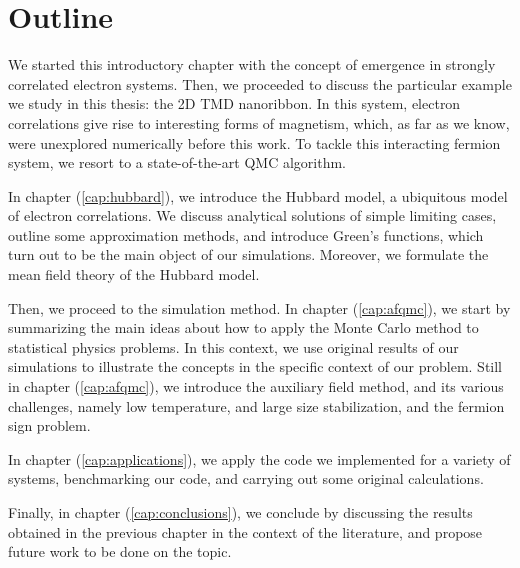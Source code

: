 \section{Outline}
\label{sec:int_outline}

We started this introductory chapter with the concept of emergence in strongly correlated electron systems.
Then, we proceeded to discuss the particular example we study in this thesis: the \acs{2D} \acs{TMD} nanoribbon.
In this system, electron correlations give rise to interesting forms of magnetism, which, as far as we know, were unexplored numerically before this work.
To tackle this interacting fermion system, we resort to a state-of-the-art \ac{QMC} algorithm.

In chapter (\ref{cap:hubbard}), we  introduce the Hubbard model, a ubiquitous model of electron correlations.
We discuss analytical solutions of simple limiting cases, outline some approximation methods, and introduce Green's functions, which turn out to be the main object of our simulations.
Moreover, we formulate the mean field theory of the Hubbard model.

Then, we proceed to the simulation method.
In chapter (\ref{cap:afqmc}), we start by summarizing the main ideas about how to apply the Monte Carlo method to statistical physics problems.
In this context, we use original results of our simulations to illustrate the concepts in the specific context of our problem.
Still in chapter (\ref{cap:afqmc}), we introduce the auxiliary field method, and its various challenges, namely low temperature, and large size stabilization, and the fermion sign problem.

In chapter (\ref{cap:applications}), we apply the code we implemented for a variety of systems, benchmarking our code, and carrying out some original calculations.

Finally, in chapter (\ref{cap:conclusions}), we conclude by discussing the results obtained in the previous chapter in the context of the literature, and propose future work to be done on the topic.